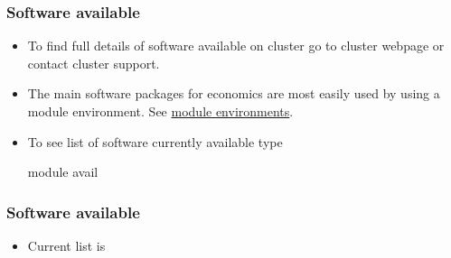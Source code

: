 \documentclass{beamer}
\begin{document}
\begin{frame}
\frametitle{Software available}
\begin{itemize}
\item To find full details of software available on cluster go to cluster webpage or contact cluster support.
\item The main software packages for economics are most easily used by using a module environment. See 
\textcolor{blue}{\href{https://www.econ.ucl.ac.uk/wiki/index.php/The_Module_Environment}{module environments}}. 
\item To see list of software currently available type \vspace{0.2cm}
\begin{semiverbatim}
module avail
\end{semiverbatim}
\end{itemize}
\end{frame}

\begin{frame}
\frametitle{Software available}
\begin{itemize}
\item Current list is 
\begin{table}[htdp]
\begin{center}
\end{center}
\label{default}
\end{table}
\end{itemize}
\end{frame}
\end{document}
